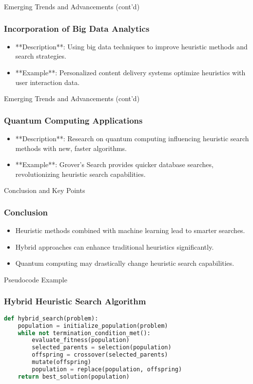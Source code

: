 \documentclass[aspectratio=169]{beamer}
\begin{document}
\begin{frame}{Emerging Trends and Advancements (cont'd)}
    \frametitle{Incorporation of Big Data Analytics}
    \begin{itemize}
        \item **Description**: Using big data techniques to improve heuristic methods and search strategies.
        \item **Example**: Personalized content delivery systems optimize heuristics with user interaction data.
    \end{itemize}
\end{frame}

\begin{frame}{Emerging Trends and Advancements (cont'd)}
    \frametitle{Quantum Computing Applications}
    \begin{itemize}
        \item **Description**: Research on quantum computing influencing heuristic search methods with new, faster algorithms.
        \item **Example**: Grover's Search provides quicker database searches, revolutionizing heuristic search capabilities.
    \end{itemize}
\end{frame}

\begin{frame}{Conclusion and Key Points}
    \frametitle{Conclusion}
    \begin{itemize}
        \item Heuristic methods combined with machine learning lead to smarter searches.
        \item Hybrid approaches can enhance traditional heuristics significantly.
        \item Quantum computing may drastically change heuristic search capabilities.
    \end{itemize}
\end{frame}

\begin{frame}[fragile]{Pseudocode Example}
    \frametitle{Hybrid Heuristic Search Algorithm}
    \begin{lstlisting}[language=Python]
def hybrid_search(problem):
    population = initialize_population(problem)
    while not termination_condition_met():
        evaluate_fitness(population)
        selected_parents = selection(population)
        offspring = crossover(selected_parents)
        mutate(offspring)
        population = replace(population, offspring)
    return best_solution(population)
    \end{lstlisting}
\end{frame}
\end{document}
